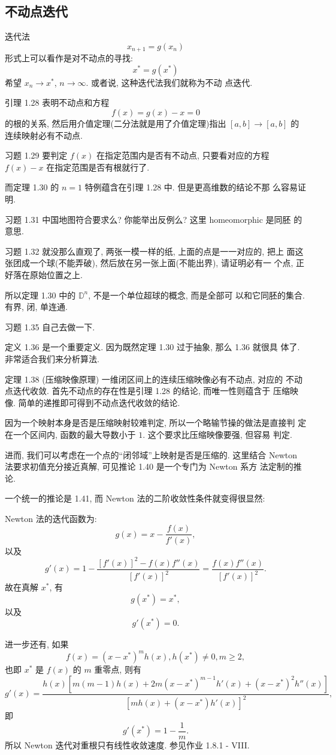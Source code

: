 \documentclass[a4paper]{ctexart}
\begin{document}
\subsection{不动点迭代}
迭代法
$$
x_{n + 1} = g(x_n) 
$$
形式上可以看作是对不动点的寻找:
$$
x^* = g(x^*)
$$希望 $x_n \to x^*$, $n \to \infty$. 或者说, 这种迭代法我们就称为不动
点迭代.

引理 1.28 表明不动点和方程
$$
f(x) = g(x) - x = 0
$$
的根的关系, 然后用介值定理(二分法就是用了介值定理)指出
$[a, b] \to [a, b]$ 的连续映射必有不动点. 

习题 1.29 要判定 $f(x)$ 在指定范围内是否有不动点, 只要看对应的方程
$f(x) - x$ 在指定范围是否有根就行了.

而定理 1.30 的 $n = 1$ 特例蕴含在引理 1.28 中. 但是更高维数的结论不那
么容易证明.

习题 1.31 中国地图符合要求么? 你能举出反例么? 这里 homeomorphic 是同胚
的意思. 

习题 1.32 就没那么直观了, 两张一模一样的纸, 上面的点是一一对应的, 把上
面这张团成一个球(不能弄破), 然后放在另一张上面(不能出界), 请证明必有一
个点, 正好落在原始位置之上.

所以定理 1.30 中的 $\mathbb{D}^n$, 不是一个单位超球的概念, 而是全部可
以和它同胚的集合. 有界, 闭, 单连通. 

习题 1.35 自己去做一下. 

定义 1.36 是一个重要定义. 因为既然定理 1.30 过于抽象, 那么 1.36 就很具
体了. 非常适合我们来分析算法.

定理 1.38 (压缩映像原理) 一维闭区间上的连续压缩映像必有不动点, 对应的
不动点迭代收敛. 首先不动点的存在性是引理 1.28 的结论, 而唯一性则蕴含于
压缩映像. 简单的递推即可得到不动点迭代收敛的结论.

因为一个映射本身是否是压缩映射较难判定, 所以一个略输节操的做法是直接判
定在一个区间内, 函数的最大导数小于 $1$. 这个要求比压缩映像要强, 但容易
判定.

进而, 我们可以考虑在一个点的``闭邻域''上映射是否是压缩的. 这里结合
Newton 法要求初值充分接近真解, 可见推论 1.40 是一个专门为 Newton 系方
法定制的推论.

一个统一的推论是 1.41, 而 Newton 法的二阶收敛性条件就变得很显然:

Newton 法的迭代函数为:
$$
g(x) = x - \frac{f(x)}{f'(x)},
$$
以及
$$
g'(x) = 1 - \frac{\left[f'(x)\right]^2 - f(x)f''(x)}{\left[f'(x)\right]^2}
= \frac{f(x)f''(x)}{\left[f'(x)\right]^2}.
$$
故在真解 $x^*$, 有
$$
g(x^*) = x^*, 
$$
以及
$$
g'(x^*) = 0.
$$

进一步还有, 如果
$$
f(x) = (x - x^*)^m h(x), h(x^*) \neq 0, m \geq 2,
$$
也即 $x^*$ 是 $f(x)$ 的 $m$ 重零点, 则有
$$
g'(x) = \frac{h(x)\left[m(m - 1)h(x) + 2m(x - x^*)^{m - 1}h'(x)
    + (x - x^*)^2h''(x)\right]}{\left[mh(x) + (x - x^*)h'(x)\right]^2},
$$
即
$$
g'(x^*) = 1 - \frac{1}{m}.
$$
所以 Newton 迭代对重根只有线性收敛速度. 参见作业 1.8.1 - VIII.
\end{document}
